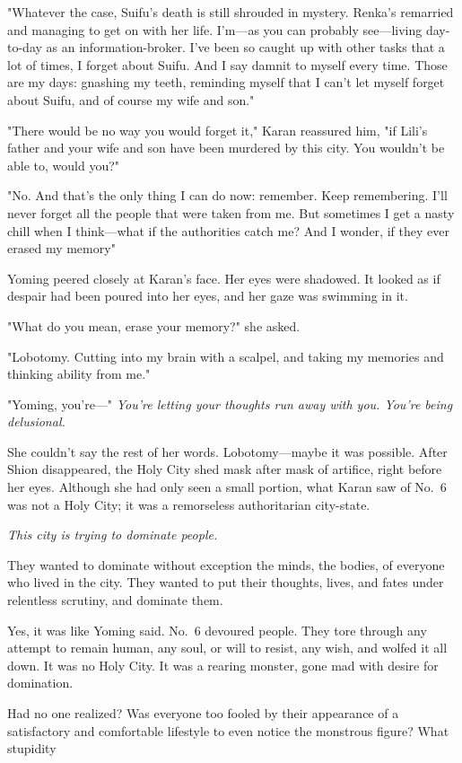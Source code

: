"Whatever the case, Suifu's death is still shrouded in mystery. Renka's
remarried and managing to get on with her life. I'm---as you can probably
see---living day-to-day as an information-broker. I've been so caught up
with other tasks that a lot of times, I forget about Suifu. And I say
damnit to myself every time. Those are my days: gnashing my teeth,
reminding myself that I can't let myself forget about Suifu, and of
course my wife and son."

"There would be no way you would forget it," Karan reassured him, "if
Lili's father and your wife and son have been murdered by this city. You
wouldn't be able to, would you?"

"No. And that's the only thing I can do now: remember. Keep remembering.
I'll never forget all the people that were taken from me. But sometimes
I get a nasty chill when I think---what if the authorities catch me? And I
wonder, if they ever erased my memory\el "

Yoming peered closely at Karan's face. Her eyes were shadowed. It looked
as if despair had been poured into her eyes, and her gaze was swimming
in it.

"What do you mean, erase your memory?" she asked.

"Lobotomy. Cutting into my brain with a scalpel, and taking my memories
and thinking ability from me."

"Yoming, you're---" \emph{You're letting your thoughts run away with you. You're
being delusional.}

She couldn't say the rest of her words. Lobotomy---maybe it was possible.
After Shion disappeared, the Holy City shed mask after mask of artifice,
right before her eyes. Although she had only seen a small portion, what
Karan saw of No.~6 was not a Holy City; it was a remorseless
authoritarian city-state.

\emph{This city is trying to dominate people.}

They wanted to dominate without exception the minds, the bodies, of
everyone who lived in the city. They wanted to put their thoughts,
lives, and fates under relentless scrutiny, and dominate them.

Yes, it was like Yoming said. No.~6 devoured people. They tore through
any attempt to remain human, any soul, or will to resist, any wish, and
wolfed it all down. It was no Holy City. It was a rearing monster, gone
mad with desire for domination.

Had no one realized? Was everyone too fooled by their appearance of a
satisfactory and comfortable lifestyle to even notice the monstrous
figure? What stupidity\el 

